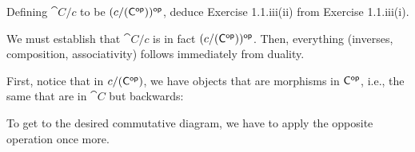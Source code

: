 \documentclass[notes,tikz]{agony}
\renewcommand{\C}{\cat{C}}
\begin{document}
\begin{xca}
  Defining $\C/c$ to be $(c/(\C\op))\op$,
  deduce Exercise 1.1.iii(ii) from Exercise 1.1.iii(i).
\end{xca}
\begin{prf}
  We must establish that $\C/c$ is in fact $(c/(\C\op))\op$.
  Then, everything (inverses, composition, associativity) follows immediately from duality.

  First, notice that in $c/(\C\op)$,
  we have objects that are morphisms in $\C\op$, i.e.,
  the same that are in $\C$ but backwards:
  \begin{center}
  \end{center}
  To get to the desired commutative diagram, we have to apply the opposite operation once more.
\end{prf}
\end{document}
